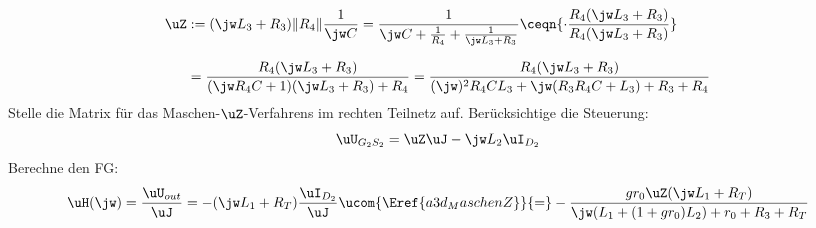 \begin{align*}%
	\uZ&:=(\jw L_3+R_3)\|R_4\|\frac{1}{\jw C}=\frac{1}{%
		\jw C+\frac{1}{R_4}+\frac{1}{\jw L_3+R_3}%
	}\ceqn{%
		\cdot\frac{%
			R_4(\jw L_3+R_3)%
		}{%
			R_4(\jw L_3+R_3)%
		}%
	}\\[2.5mm]%
%
	&=\frac{%
		R_4(\jw L_3+R_3)%
	}{%
		(\jw R_4C+1)(\jw L_3+R_3)+R_4%
	}=\frac{%
		R_4(\jw L_3+R_3)%
	}{%
		(\jw)^2R_4CL_3+\jw(R_3R_4C+L_3)+R_3+R_4%
	}%
\end{align*}%
%
Stelle die Matrix für das Maschen-$\uZ$-Verfahrens im rechten Teilnetz auf. 
%
%
Berücksichtige die Steuerung:
\[%
	\uU_{G_2S_2}=\uZ\uJ-\jw L_2\uI_{D_2}%
\]%
%
Berechne den FG:
\[%
	\uH(\jw)=\frac{\uU_{out}}{\uJ}=-(\jw L_1+R_T)\frac{\uI_{D_2}}{\uJ}\ucom{%
		\Eref{a3d_MaschenZ}%
	}{=}-\frac{%
		gr_0\uZ(\jw L_1+R_T)%
	}{%
		\jw(L_1+(1+gr_0)L_2)+r_0+R_3+R_T%
	}%
\]%

